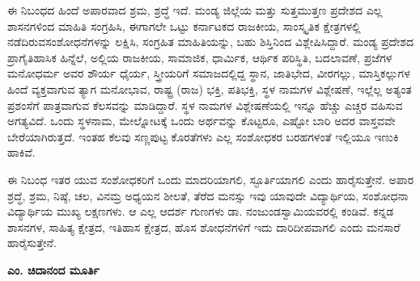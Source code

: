 ಈ ನಿಬಂಧದ ಹಿಂದೆ ಅಪಾರವಾದ ಶ್ರಮ, ಶ್ರದ್ಧೆ ಇದೆ. ಮಂಡ್ಯ ಜಿಲ್ಲೆಯ ಮತ್ತು ಸುತ್ತಮುತ್ತಣ ಪ್ರದೇಶದ ಎಲ್ಲ ಶಾಸನಗಳಿಂದ ಮಾಹಿತಿ ಸಂಗ್ರಹಿಸಿ, ಈಗಾಗಲೇ ಒಟ್ಟು ಕರ್ನಾಟಕದ ರಾಜಕೀಯ, ಸಾಂಸ್ಕೃತಿಕ ಕ್ಷೇತ್ರಗಳಲ್ಲಿ ನಡೆದಿರುವ\break ಸಂಶೋಧನೆಗಳನ್ನು ಲಕ್ಷಿಸಿ, ಸಂಗ್ರಹಿತ ಮಾಹಿತಿಯನ್ನು, ಬಹು ಶಿಸ್ತಿನಿಂದ ವಿಶ್ಲೇಷಿಸಿದ್ದಾರೆ. ಮಂಡ್ಯ ಪ್ರದೇಶದ ಪ್ರಾಗೈತಿಹಾಸಿಕ ಹಿನ್ನೆಲೆ, ಅಲ್ಲಿಯ ರಾಜಕೀಯ, ಸಾಮಾಜಿಕ, ಧಾರ್ಮಿಕ, ಆರ್ಥಿಕ ಪರಿಸ್ಥಿತಿ, ಬದಲಾವಣೆ, ಪ್ರಜೆಗಳ ಮನೋಧರ್ಮ ಅವರ ಶೌರ್ಯ ಧೈರ್ಯ, ಸ್ತ್ರೀಯರಿಗೆ ಸಮಾಜದಲ್ಲಿದ್ದ ಸ್ಥಾನ, ಜಾತಿಭೇದ, ವೀರಗಲ್ಲು, ಮಾಸ್ತಿಕಲ್ಲುಗಳ ಹಿಂದೆ ವ್ಯಕ್ತವಾಗುವ ತ್ಯಾಗ ಮನೋಭಾವ, ರಾಷ್ಟ್ರ (ರಾಜ) ಭಕ್ತಿ, ಪತಿಭಕ್ತಿ, ಸ್ಥಳ ನಾಮಗಳ ವಿಶ್ಲೇಷಣೆ, ಇಲ್ಲೆಲ್ಲ ಅತ್ಯಂತ ಪ್ರಶಂಸೆಗೆ ಪಾತ್ರವಾಗುವ ಕೆಲಸವನ್ನು ಮಾಡಿದ್ದಾರೆ. ಸ್ಥಳ ನಾಮಗಳ ವಿಶ್ಲೇಷಣೆಯಲ್ಲಿ ಇನ್ನೂ ಹೆಚ್ಚು ಎಚ್ಚರ ವಹಿಸುವ ಅಗತ್ಯವಿದೆ. ಒಂದು ಸ್ಥಳನಾಮ, ಮೇಲ್ನೋಟಕ್ಕೆ ಒಂದು ಅರ್ಥವನ್ನು ಕೊಟ್ಟರೂ, ಎಷ್ಟೋ ಬಾರಿ ಅದರ ವಾಸ್ತವವೇ ಬೇರೆಯಾಗಿರುತ್ತದೆ. ಇಂತಹ ಕೆಲವು ಸಣ್ಣಪುಟ್ಟ ಕೊರತೆಗಳು ಎಲ್ಲ ಸಂಶೋಧಕರ ಬರಹಗಳಂತೆ ಇಲ್ಲಿಯೂ ಇಣುಕಿ ಹಾಕಿವೆ. 

ಈ ನಿಬಂಧ ಇತರ ಯುವ ಸಂಶೋಧಕರಿಗೆ ಒಂದು ಮಾದರಿಯಾಗಲಿ, ಸ್ಫೂರ್ತಿಯಾಗಲಿ ಎಂದು ಹಾರೈಸುತ್ತೇನೆ. ಅಪಾರ ಶ್ರದ್ಧೆ, ಶ್ರಮ, ನಿಷ್ಠೆ, ಚಲ, ವಿನಮ್ರ ಅಧ್ಯಯನ ಶೀಲತೆ, ತೆರೆದ ಮನಸ್ಸು ಇವು ಯಾವುದೇ ವಿದ್ಯಾರ್ಥಿಯ, ಸಂಶೋಧನಾ ವಿದ್ಯಾರ್ಥಿಯ ಮುಖ್ಯ ಲಕ್ಷಣಗಳು. ಆ ಎಲ್ಲ ಆದರ್ಶ ಗುಣಗಳು ಡಾ. ನಂಜುಂಡಸ್ವಾಮಿಯವರಲ್ಲಿ ಕಂಡಿವೆ. ಕನ್ನಡ ಶಾಸನಗಳ, ಸಾಹಿತ್ಯ ಕ್ಷೇತ್ರದ, ಇತಿಹಾಸ ಕ್ಷೇತ್ರದ, ಹೊಸ ಶೋಧನೆಗಳಿಗೆ ಇದು ದಾರಿದೀಪವಾಗಲಿ ಎಂದು ಮನಸಾರೆ ಹಾರೈಸುತ್ತೇನೆ.

\begin{flushright}
\textbf{ಎಂ. ಚಿದಾನಂದ ಮೂರ್ತಿ}
\end{flushright}

